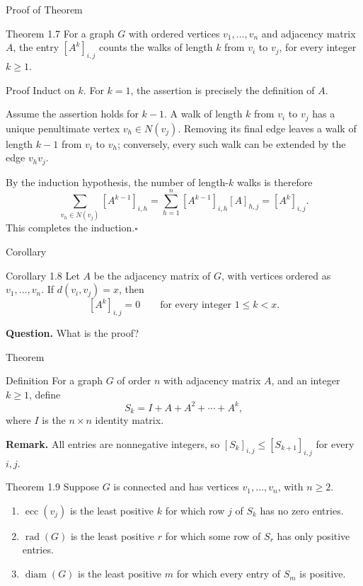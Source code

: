 \documentclass[aspectratio=169,11pt]{beamer}
\begin{document}
\begin{frame}[t]{Proof of Theorem}
\begin{block}{Theorem 1.7}
For a graph $G$ with ordered vertices $v_1,\ldots,v_n$ and adjacency matrix $A$, the entry $[A^k]_{i,j}$ counts the walks of length $k$ from $v_i$ to $v_j$, for every integer $k\geq 1$.
\end{block}

\begin{block}{Proof}
\footnotesize
Induct on $k$. For $k=1$, the assertion is precisely the definition of $A$.

\smallskip
Assume the assertion holds for $k-1$. A walk of length $k$ from $v_i$ to $v_j$ has a unique penultimate vertex $v_h\in N(v_j)$. Removing its final edge leaves a walk of length $k-1$ from $v_i$ to $v_h$; conversely, every such walk can be extended by the edge $v_hv_j$.

\smallskip
By the induction hypothesis, the number of length-$k$ walks is therefore
\[
\sum_{v_h\in N(v_j)}[A^{k-1}]_{i,h}
=\sum_{h=1}^{n}[A^{k-1}]_{i,h}[A]_{h,j}
=[A^k]_{i,j}.
\]
This completes the induction.\hfill$\square$
\end{block}
\vfill
\end{frame}


\begin{frame}[t]{Corollary}
\begin{block}{Corollary 1.8}
Let $A$ be the adjacency matrix of $G$, with vertices ordered as $v_1,\ldots,v_n$. If $d(v_i,v_j)=x$, then
\[
[A^k]_{i,j}=0 \qquad\text{for every integer }1\leq k<x.
\]
\end{block}

\vspace{0.45cm}
\textbf{Question.} What is the proof?

\vfill
\end{frame}


\begin{frame}[t]{Theorem}
\begin{block}{Definition}
For a graph $G$ of order $n$ with adjacency matrix $A$, and an integer $k\geq 1$, define
\[
S_k=I+A+A^2+\cdots+A^k,
\]
where $I$ is the $n\times n$ identity matrix.
\end{block}

\smallskip
\textbf{Remark.} All entries are nonnegative integers, so
$[S_k]_{i,j}\leq [S_{k+1}]_{i,j}$ for every $i,j$.

\begin{block}{Theorem 1.9}
\small
Suppose $G$ is connected and has vertices $v_1,\ldots,v_n$, with $n\geq 2$.
\begin{enumerate}
\setlength{\itemsep}{0.15cm}
\item $\operatorname{ecc}(v_j)$ is the least positive $k$ for which row $j$ of $S_k$ has no zero entries.
\item $\operatorname{rad}(G)$ is the least positive $r$ for which some row of $S_r$ has only positive entries.
\item $\operatorname{diam}(G)$ is the least positive $m$ for which every entry of $S_m$ is positive.
\end{enumerate}
\end{block}
\end{frame}
\end{document}
